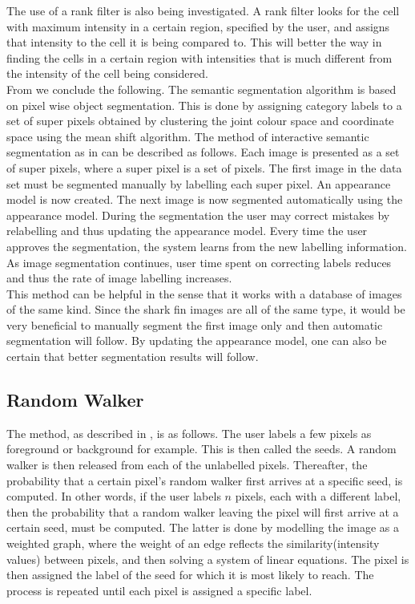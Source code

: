 \documentclass[a4paper,10pt]{article}
\begin{document}
The use of a rank filter is also being investigated.  A rank filter looks for
the cell with maximum intensity in a certain region, specified by the user, 
and assigns that intensity to the cell it is being compared to.  This will
better the way in finding the cells in a certain region with intensities that 
is much different from the intensity of the cell being considered. \\  

\noindent From \cite{RF} we conclude the following.  The semantic segmentation
algorithm is based on pixel wise object segmentation.  This is done by 
assigning category labels to a set of super pixels obtained by clustering the
joint colour space and coordinate space using the mean shift algorithm.
The method of interactive semantic segmentation as in \cite{RF} can be described
as follows.  Each image is presented as a set of super pixels, where 
a super pixel is a set of pixels.  The first image in the data set must be
segmented manually by labelling each super pixel.  An appearance model is 
now created.  The next image is now segmented automatically using the appearance
model.  During the segmentation the user may correct mistakes by 
relabelling and thus updating the appearance model.  Every time the user
approves the segmentation, the system learns from the new labelling information.
As image segmentation continues, user time spent on correcting labels reduces
and thus the rate of image labelling increases.  \\

This method can be helpful in the sense that it works with a database of images
of the same kind.  Since the shark fin images are all of the same type, 
it would be very beneficial to manually segment the first image only and then
automatic segmentation will follow.  By updating the appearance model, 
one can also be certain that better segmentation results will follow.  \\  


\subsection{Random Walker}
The method, as
described in \cite{rw}, is as follows.  The user labels a few
pixels as foreground or background for example.  This is then called the seeds. 
A random walker is then released from each of the unlabelled pixels. 
Thereafter, the probability that a certain pixel's random walker first arrives
at a specific seed, is computed.  In other words, if the user labels $n$
pixels, each with a different label, then the probability that a random walker
leaving the pixel will first arrive at a certain seed, must be
computed.  The latter is done by modelling the image as a weighted graph, where
the weight of an edge reflects the similarity(intensity values) between pixels,
and then solving a system of linear equations.  The pixel is then assigned the
label
of the seed for which it is most likely to reach.  The process is repeated until
each pixel is assigned a specific label. 
\end{document}
